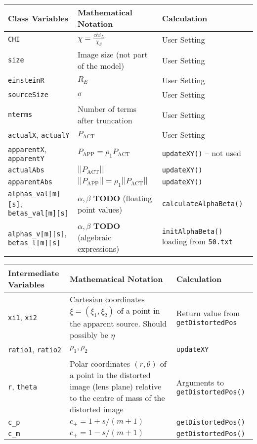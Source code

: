 \documentclass{scrartcl}
\begin{document}
\begin{center}
   \begin{tabular}{p{3cm}|p{6.5cm}|p{4cm}}
\hline
  Class Variables & Mathematical Notation & Calculation \\
\hline
\hline
   \texttt{CHI}       & $\chi=\frac{chi_L}{\chi_S}$      & User Setting \\
\hline
   \texttt{size}      & Image size (not part of the model) & User Setting \\
\hline
   \texttt{einsteinR} & $R_E$                              & User Setting \\
\hline
   \texttt{sourceSize} & $\sigma$                          & User Setting \\
\hline
   \texttt{nterms}    & Number of terms after truncation    & User Setting \\
\hline
   \texttt{actualX}, \texttt{actualY} & $P_{\textrm{ACT}}$  & User Setting\\
\hline
   \texttt{apparentX}, \texttt{apparentY} 
         & $P_{\textrm{APP}}=\rho_1P_{\textrm{ACT}}$ 
         & \texttt{updateXY()} -- not used \\
\hline
   \texttt{actualAbs} & $||P_{\textrm{ACT}}||$ & \texttt{updateXY()} \\
\hline
   \texttt{apparentAbs} & $||P_{\textrm{APP}}||=\rho_1||P_{\textrm{ACT}}||$
      & \texttt{updateXY()} \\
\hline
   \texttt{alphas\_val[m][s]},
   \texttt{betas\_val[m][s]}  & $\alpha,\beta$ \textbf{TODO}
        (floating point values)
        & \texttt{calculateAlphaBeta()} \\
\hline
   \texttt{alphas\_v[m][s]},
   \texttt{betas\_l[m][s]}  & $\alpha,\beta$ \textbf{TODO}
        (algebraic expressions)
        & \texttt{initAlphaBeta()} loading from \texttt{50.txt} \\
\hline
\end{tabular}
\end{center}

\begin{center}
   \begin{tabular}{p{2cm}|p{7cm}|p{4.5cm}}
\hline
   Intermediate Variables & Mathematical Notation & Calculation \\
\hline
\hline
   \texttt{xi1}, \texttt{xi2}       & Cartesian coordinates $\xi=(\xi_1,\xi_2)$ of a point in the apparent source.  Should possibly be $\eta$     & Return value from \texttt{getDistortedPos} \\
\hline
   \texttt{ratio1}, \texttt{ratio2} & $\rho_1,\rho_2$   & \texttt{updateXY}        \\
\hline
   \texttt{r}, \texttt{theta} & Polar coordinates $(r,\theta)$ of a point in the distorted image (lens plane) relative to the centre of mass of the distorted image &
      Arguments to \texttt{getDistortedPos()} \\
\hline
      \texttt{c\_p} & $c_+=1+s/(m+1)$ & \texttt{getDistortedPos()} \\
\hline
      \texttt{c\_m} & $c_+=1-s/(m+1)$ & \texttt{getDistortedPos()} \\
\hline
\hline
\end{tabular}
\end{center}
\end{document}
